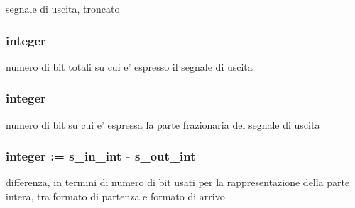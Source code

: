 segnale di uscita, troncato 

\hypertarget{group___truncation_ga8b62f8bfecb0fab845995b8b051101bc}{
\subsubsection[{s\+\_\+out\+\_\+dim}]{ {\bfseries \textcolor{vhdlchar}{ }} {\bfseries \textcolor{vhdlchar}{integer}\textcolor{vhdlchar}{ }} \hspace{0.3cm}{\ttfamily [Generic]}}}\label{group___truncation_ga8b62f8bfecb0fab845995b8b051101bc}


numero di bit totali su cui e' espresso il segnale di uscita 

\hypertarget{group___truncation_ga4ca792ca981e2f9d82bf36d9c82c08af}{
\subsubsection[{s\+\_\+out\+\_\+int}]{ {\bfseries \textcolor{vhdlchar}{ }} {\bfseries \textcolor{vhdlchar}{integer}\textcolor{vhdlchar}{ }} \hspace{0.3cm}{\ttfamily [Generic]}}}\label{group___truncation_ga4ca792ca981e2f9d82bf36d9c82c08af}


numero di bit su cui e' espressa la parte frazionaria del segnale di uscita 

\hypertarget{group___truncation_ga63701d8af27da7452a7588efcff357bc}{
\subsubsection[{x}]{ {\bfseries \textcolor{vhdlchar}{integer}\textcolor{vhdlchar}{ }\textcolor{vhdlchar}{ }\textcolor{vhdlchar}{\+:}\textcolor{vhdlchar}{=}\textcolor{vhdlchar}{ }\textcolor{vhdlchar}{ }\textcolor{vhdlchar}{ }\textcolor{vhdlchar}{ }{\bfseries {\bf s\+\_\+in\+\_\+int}} \textcolor{vhdlchar}{-\/}\textcolor{vhdlchar}{ }\textcolor{vhdlchar}{ }\textcolor{vhdlchar}{ }{\bfseries {\bf s\+\_\+out\+\_\+int}} \textcolor{vhdlchar}{ }} \hspace{0.3cm}{\ttfamily [Constant]}}}\label{group___truncation_ga63701d8af27da7452a7588efcff357bc}


differenza, in termini di numero di bit usati per la rappresentazione della parte intera, tra formato di partenza e formato di arrivo 

